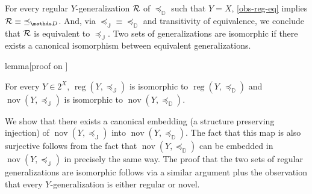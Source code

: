 \documentclass[12pt,a4paper,twoside]{article}
\newcommand{\reg}{\operatorname{reg}}
\newcommand{\nov}{\operatorname{nov}}
\newcommand{\preceqb}{\mathbin{\preceq}}
\newcommand{\ext}{\mathrel{\mc R}}
\newcommand{\extb}{\mathbin{\mc R}}
\newcommand{\mbbd}{{\mathds D}}
\newcommand{\mbbi}{{\mathds L}}
\newcommand{\mbbj}{\mathds J}
\begin{document}
\begin{appendices}
 For every regular $Y$-{generalization} $\ext$ of $\preceq_{\mbbd}$ such that $Y=X$,
 \cref{obs-reg-eq} implies $\extb\equiv \preceqb_{\mbbd}$. And, via
 $\preceqb_{\mbbj}\equiv \preceqb_{\mbbd}$ and transitivity of equivalence, we
 conclude that $\ext$ is equivalent to $\preceq_{\mbbj}$.  Two sets of
 {generalization}s are isomorphic if there exists a canonical isomorphism between
 equivalent {generalization}s. 


\begin{theoremEnd}{lemma}[proof on ]
  \label{lem-nov-iso}

  For every $Y \in 2 ^ { X }$, $\reg(Y, \preceqb_{\mbbj})$ is isomorphic to
  $\reg(Y,\preceqb_{\mbbd})$ and
  $\nov ( Y , \preceqb_{\mbbj} )$ is isomorphic to $\nov ( Y , \preceqb _ \mbbd )$.


\end{theoremEnd}
\begin{proofEnd}%
  \label{proof-nov-iso}

  We show that there exists a canonical embedding (a structure preserving
  injection) of $\nov ( Y , \preceqb _ \mbbj )$ into
  $\nov ( Y , \preceqb _ \mbbd )$. The fact that this map is also
  surjective follows from the fact that $\nov ( Y , \preceqb _ \mbbd )$
  can be embedded in $\nov ( Y , \preceqb _ \mbbj )$ in precisely the same
  way. The proof that the two sets of regular {generalization}s are isomorphic follows
  via a similar argument plus the observation that every $Y$-{generalization} is either
  regular or novel.


\end{proofEnd}
\end{appendices}
\end{document}
